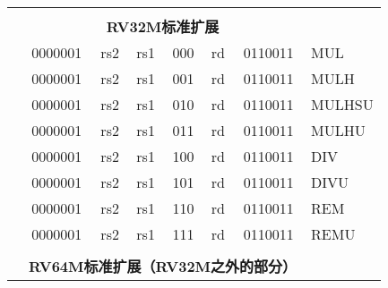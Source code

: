 \begin{table}[p]
\begin{small}
\begin{center}
\begin{tabular}{p{0in}p{0.4in}p{0.05in}p{0.05in}p{0.05in}p{0.05in}p{0.4in}p{0.6in}p{0.4in}p{0.6in}p{0.7in}l}
&
\multicolumn{10}{c}{} & \\
&
\multicolumn{10}{c}{\bf RV32M标准扩展 } & \\
\cline{2-11}


&
\multicolumn{4}{|c|}{0000001} &
\multicolumn{2}{c|}{rs2} &
\multicolumn{1}{c|}{rs1} &
\multicolumn{1}{c|}{000} &
\multicolumn{1}{c|}{rd} &
\multicolumn{1}{c|}{0110011} & MUL \\
\cline{2-11}


&
\multicolumn{4}{|c|}{0000001} &
\multicolumn{2}{c|}{rs2} &
\multicolumn{1}{c|}{rs1} &
\multicolumn{1}{c|}{001} &
\multicolumn{1}{c|}{rd} &
\multicolumn{1}{c|}{0110011} & MULH \\
\cline{2-11}


&
\multicolumn{4}{|c|}{0000001} &
\multicolumn{2}{c|}{rs2} &
\multicolumn{1}{c|}{rs1} &
\multicolumn{1}{c|}{010} &
\multicolumn{1}{c|}{rd} &
\multicolumn{1}{c|}{0110011} & MULHSU \\
\cline{2-11}


&
\multicolumn{4}{|c|}{0000001} &
\multicolumn{2}{c|}{rs2} &
\multicolumn{1}{c|}{rs1} &
\multicolumn{1}{c|}{011} &
\multicolumn{1}{c|}{rd} &
\multicolumn{1}{c|}{0110011} & MULHU \\
\cline{2-11}


&
\multicolumn{4}{|c|}{0000001} &
\multicolumn{2}{c|}{rs2} &
\multicolumn{1}{c|}{rs1} &
\multicolumn{1}{c|}{100} &
\multicolumn{1}{c|}{rd} &
\multicolumn{1}{c|}{0110011} & DIV \\
\cline{2-11}


&
\multicolumn{4}{|c|}{0000001} &
\multicolumn{2}{c|}{rs2} &
\multicolumn{1}{c|}{rs1} &
\multicolumn{1}{c|}{101} &
\multicolumn{1}{c|}{rd} &
\multicolumn{1}{c|}{0110011} & DIVU \\
\cline{2-11}


&
\multicolumn{4}{|c|}{0000001} &
\multicolumn{2}{c|}{rs2} &
\multicolumn{1}{c|}{rs1} &
\multicolumn{1}{c|}{110} &
\multicolumn{1}{c|}{rd} &
\multicolumn{1}{c|}{0110011} & REM \\
\cline{2-11}


&
\multicolumn{4}{|c|}{0000001} &
\multicolumn{2}{c|}{rs2} &
\multicolumn{1}{c|}{rs1} &
\multicolumn{1}{c|}{111} &
\multicolumn{1}{c|}{rd} &
\multicolumn{1}{c|}{0110011} & REMU \\
\cline{2-11}


&
\multicolumn{10}{c}{} & \\
&
\multicolumn{10}{c}{\bf RV64M标准扩展（RV32M之外的部分）} & \\
\cline{2-11}



\end{tabular}
\end{center}
\end{small}
\end{table}
